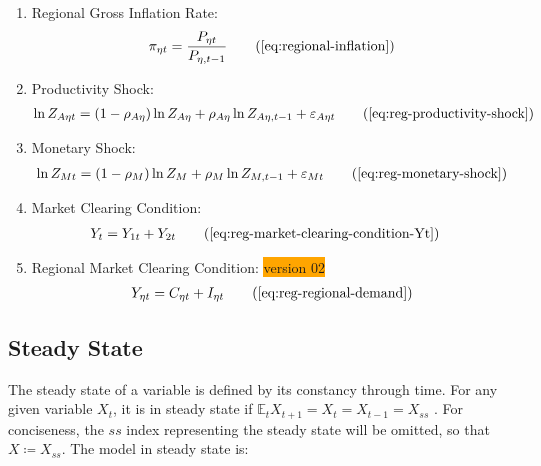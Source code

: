 \documentclass[../thesis.tex]{subfiles}
\begin{document}
{\begin{itemize}
\begin{enumerate}
		\item Regional Gross Inflation Rate:
		\begin{align}
			\pi_{\eta t} = \frac{P_{\eta t}}{P_{\eta, t-1}} \tag{\ref{eq:regional-inflation}}
		\end{align}
		
		\item Productivity Shock:
		\begin{align}
			\ln{Z_{A\eta t}} = (1-\rho_{A\eta})\ln{Z_{A\eta}} + \rho_{A\eta}\ln{Z_{A\eta,t-1}} + \varepsilon_{A\eta t} \tag{\ref{eq:reg-productivity-shock}}
		\end{align}
		
		\item Monetary Shock:
		\begin{align}
			\ln{Z_{Mt}} = (1-\rho_M)\ln{Z_{M}} + \rho_M\ln{Z_{M,t-1}} + \varepsilon_{Mt} \tag{\ref{eq:reg-monetary-shock}}
		\end{align}

		\item Market Clearing Condition:
		\begin{align}
			Y_{t} &= Y_{1 t} + Y_{2 t} \tag{\ref{eq:reg-market-clearing-condition-Yt}}
		\end{align}

		\item Regional Market Clearing Condition: \colorbox{orange}{version 02}
		\begin{align}
			Y_{\eta t} = C_{\eta t} + I_{\eta t} \tag{\ref{eq:reg-regional-demand}}
		\end{align}
						
		\end{enumerate}
		
	\end{itemize}
	
} %



\subsection{Steady State}

The steady state of a variable is defined by its constancy through time. For any given variable $X_t$, it is in steady state if $\mathbb{E}_t X_{t+1} = X_t = X_{t-1} = X_{ss}$ \cite[p.41]{costa_junior_understanding_2016}. For conciseness, the $ss$ index representing the steady state will be omitted, so that $X \coloneq X_{ss}$. The model in steady state is:
\end{document}
